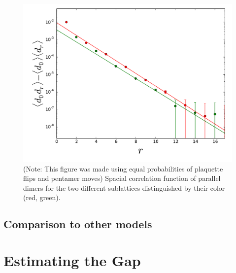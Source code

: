 \documentclass[aps,floatfix,11pt,twocolumn]{revtex4-1}
\begin{document}
    \begin{figure}[htpb]
        \centering
        \includegraphics[width=0.8\linewidth]{spacial_dmr_cor.pdf}
        \caption{(Note: This figure was made using equal probabilities of plaquette flips and
        pentamer moves) Spacial correlation function of parallel dimers for the two different
        sublattices distinguished by their color (red, green).}
        \label{fig:spacial_dmr_cor}
    \end{figure}

    \subsection{Comparison to other models}

\section{Estimating the Gap}
\end{document}
